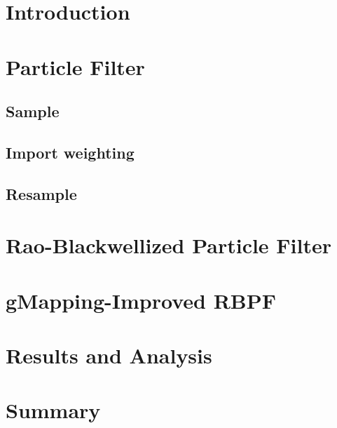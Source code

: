 \section{Introduction}

\section{Particle Filter}
\subsection{Sample}
\subsection{Import weighting}
\subsection{Resample}

\section{Rao-Blackwellized Particle Filter}

\section{gMapping-Improved RBPF}

\section{Results and Analysis}

\section{Summary}